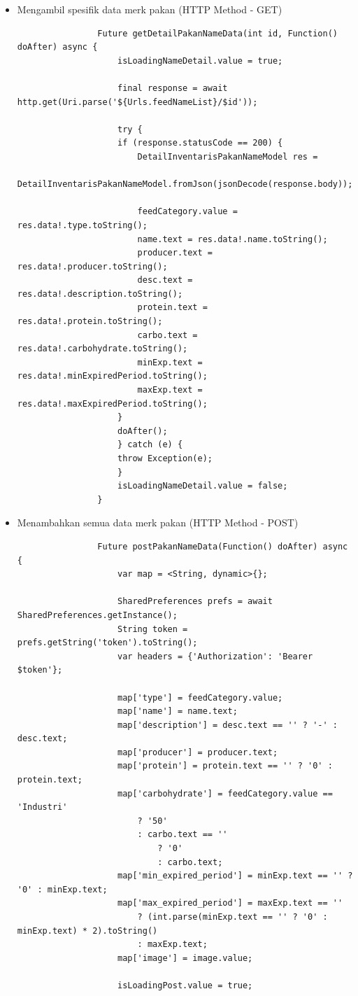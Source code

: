 \begin{spacing}{1.5}
\begin{enumerate}
\begin{itemize}
			\item Mengambil spesifik data merk pakan (HTTP Method - GET)
			
			\begin{lstlisting}
				Future getDetailPakanNameData(int id, Function() doAfter) async {
					isLoadingNameDetail.value = true;

					final response = await http.get(Uri.parse('${Urls.feedNameList}/$id'));

					try {
					if (response.statusCode == 200) {
						DetailInventarisPakanNameModel res =
							DetailInventarisPakanNameModel.fromJson(jsonDecode(response.body));

						feedCategory.value = res.data!.type.toString();
						name.text = res.data!.name.toString();
						producer.text = res.data!.producer.toString();
						desc.text = res.data!.description.toString();
						protein.text = res.data!.protein.toString();
						carbo.text = res.data!.carbohydrate.toString();
						minExp.text = res.data!.minExpiredPeriod.toString();
						maxExp.text = res.data!.maxExpiredPeriod.toString();
					}
					doAfter();
					} catch (e) {
					throw Exception(e);
					}
					isLoadingNameDetail.value = false;
				}
			\end{lstlisting}

			\item Menambahkan semua data merk pakan (HTTP Method - POST)
			
			\begin{lstlisting}
				Future postPakanNameData(Function() doAfter) async {
					var map = <String, dynamic>{};

					SharedPreferences prefs = await SharedPreferences.getInstance();
					String token = prefs.getString('token').toString();
					var headers = {'Authorization': 'Bearer $token'};

					map['type'] = feedCategory.value;
					map['name'] = name.text;
					map['description'] = desc.text == '' ? '-' : desc.text;
					map['producer'] = producer.text;
					map['protein'] = protein.text == '' ? '0' : protein.text;
					map['carbohydrate'] = feedCategory.value == 'Industri'
						? '50'
						: carbo.text == ''
							? '0'
							: carbo.text;
					map['min_expired_period'] = minExp.text == '' ? '0' : minExp.text;
					map['max_expired_period'] = maxExp.text == ''
						? (int.parse(minExp.text == '' ? '0' : minExp.text) * 2).toString()
						: maxExp.text;
					map['image'] = image.value;

					isLoadingPost.value = true;


\end{lstlisting}
\end{itemize}
\end{enumerate}
\end{spacing}
